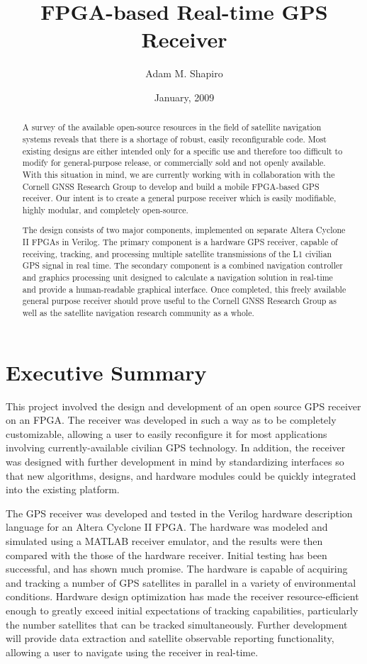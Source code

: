 \documentclass[12pt]{article}
\title{FPGA-based Real-time GPS Receiver}
\author{Adam M. Shapiro}
\date{January, 2009}
\begin{document}
\maketitle

\begin{abstract}
A survey of the available open-source resources in the field of satellite navigation 
systems reveals that there is a shortage of robust, easily reconfigurable code. Most existing 
designs are either intended only for a specific use and therefore too difficult to modify for general-purpose release, or commercially sold and not openly available. With this situation in mind, we are currently working with in collaboration with the Cornell GNSS Research Group to develop and build a mobile FPGA-based GPS receiver. Our intent is to create a general purpose receiver which is easily modifiable, highly modular, and completely open-source.

The design consists of two major components, implemented on separate Altera Cyclone II FPGAs in Verilog. The primary component is a hardware GPS receiver, capable of receiving, tracking, and processing multiple satellite transmissions of the L1 civilian GPS signal in real time. The secondary component is a combined navigation controller and graphics processing unit designed to calculate a navigation solution in real-time and provide a human-readable graphical interface. Once completed, this freely available general purpose receiver should prove useful to the Cornell GNSS Research Group as well as the satellite navigation research community as a whole.
\end{abstract}

\section*{Executive Summary}
This project involved the design and development of an open source GPS receiver on an FPGA. The receiver was developed in such a way as to be completely customizable, allowing a user to easily reconfigure it for most applications involving currently-available civilian GPS technology. In addition, the receiver was designed with further development in mind by standardizing interfaces so that new algorithms, designs, and hardware modules could be quickly integrated into the existing platform.

The GPS receiver was developed and tested in the Verilog hardware description language for an Altera Cyclone II FPGA. The hardware was modeled and simulated using a MATLAB receiver emulator, and the results were then compared with the those of the hardware receiver. Initial testing has been successful, and has shown much promise. The hardware is capable of acquiring and tracking a number of GPS satellites in parallel in a variety of environmental conditions. Hardware design optimization has made the receiver resource-efficient enough to greatly exceed initial expectations of tracking capabilities, particularly the number satellites that can be tracked simultaneously. Further development will provide data extraction and satellite observable reporting functionality, allowing a user to navigate using the receiver in real-time.
\end{document}
